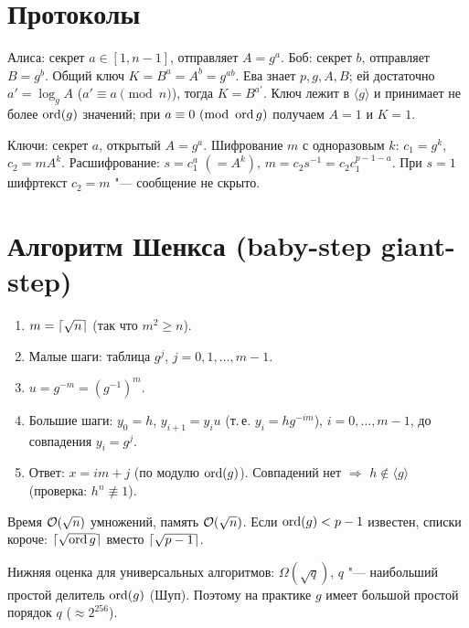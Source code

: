 \documentclass{ca-handout}
\begin{document}
\section{Протоколы}
\begin{reminder}[title={Диффи--Хеллман: открыто $p$, $g$, $n = \ord(g)$}]
Алиса: секрет $a \in [1, n - 1]$, отправляет $A = g^a$. Боб: секрет $b$, отправляет $B = g^b$.
Общий ключ $K = B^a = A^b = g^{ab}$. Ева знает $p, g, A, B$; ей достаточно $a' = \log_g A$
($a' \equiv a \pmod n$), тогда $K = B^{a'}$. Ключ лежит в $\langle g \rangle$ и принимает не более
$\operatorname{ord}(g)$ значений; при $a \equiv 0\ (\mathrm{mod}\ \operatorname{ord} g)$ получаем $A = 1$ и $K = 1$.
\end{reminder}

\begin{reminder}[title={Эль-Гамаль}]
Ключи: секрет $a$, открытый $A = g^a$. Шифрование $m$ с одноразовым $k$: $c_1 = g^k$, $c_2 = m A^k$.
Расшифрование: $s = c_1^a$ $(= A^k)$, $m = c_2 s^{-1} = c_2 c_1^{p-1-a}$. При $s = 1$ шифртекст
$c_2 = m$ "--- сообщение не скрыто.
\end{reminder}

\section{Алгоритм Шенкса (baby-step giant-step)}
\begin{reminder}[title={$g^x = h$, $n = \ord(g)$ (или граница $N \ge n$, например $p - 1$)}]
\begin{enumerate}
  \item $m = \lceil\sqrt n\rceil$ (так что $m^2 \ge n$).
  \item Малые шаги: таблица $g^j$, $j = 0, 1, \dots, m - 1$.
  \item $u = g^{-m} = (g^{-1})^m$.
  \item Большие шаги: $y_0 = h$, $y_{i+1} = y_i u$ (т.\,е. $y_i = h g^{-im}$), $i = 0, \dots, m - 1$,
    до совпадения $y_i = g^j$.
  \item Ответ: $x = im + j$ (по модулю $\operatorname{ord}(g)$). Совпадений нет $\Rightarrow$ $h \notin \langle g
    \rangle$ (проверка: $h^{n} \not\equiv 1$).
\end{enumerate}
Время $\mathcal{O}(\sqrt n)$ умножений, память $\mathcal{O}(\sqrt n)$. Если $\operatorname{ord}(g) < p - 1$ известен, списки
короче: $\lceil\sqrt{\operatorname{ord} g}\rceil$ вместо $\lceil\sqrt{p - 1}\rceil$.
\end{reminder}
Нижняя оценка для универсальных алгоритмов: $\Omega(\sqrt q)$, $q$ "--- наибольший простой делитель
$\operatorname{ord}(g)$ (Шуп). Поэтому на практике $g$ имеет большой простой порядок $q$ ($\approx 2^{256}$).
\end{document}
